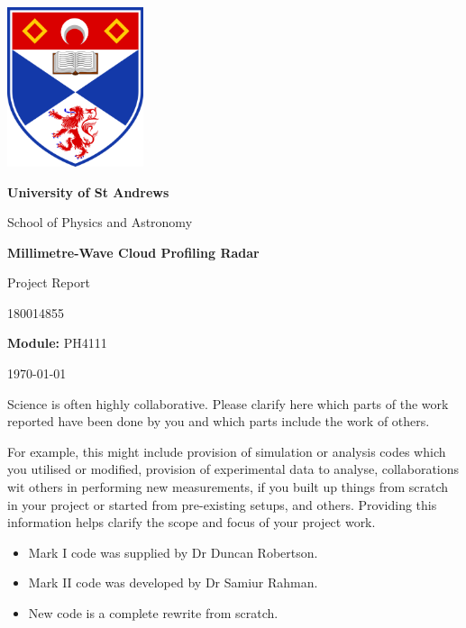\documentclass{article}
\title {\mytitle}
\author{\myauthor}
\date  {\mydate}
\newcommand\mytitle    {Millimetre-Wave Cloud Profiling Radar}
\newcommand\mysubtitle {Project Report}
\newcommand\myauthor   {180014855}
\newcommand\mymodule   {PH4111}
\newcommand\mywordcount{2300}
\begin{document}
\begin{titlepage}
	\centering
	{\includegraphics[width=0.3\textwidth]{uos-logo}}
	\par
	{\LARGE\bfseries University of St Andrews\par}
	{\LARGE School of Physics and Astronomy\par}
	\vspace{1.5cm}
	{\huge\bfseries\mytitle\par}
	{\Large\mysubtitle\par}
	\vspace{2cm}
	{\Large\myauthor\par}
	{\large\textbf{Module:} \mymodule\par}
	\vfill
	{\large\today\par}
\end{titlepage}

Science is often highly collaborative. Please clarify here which parts of the work reported have been done by you and which parts include the work of others.

For example, this might include provision of simulation or analysis codes which you utilised or modified, provision of experimental data to analyse, collaborations wit others in performing new measurements, if you built up things from scratch in your project or started from pre-existing setups, and others. Providing this information helps clarify the scope and focus of your project work.

\begin{itemize}
	\item Mark I code was supplied by Dr Duncan Robertson.
	\item Mark II code was developed by Dr Samiur Rahman.
	\item New code is a complete rewrite from scratch.
\end{itemize}

\thispagestyle{empty}
\clearpage
\setcounter{page}{1}
\end{document}
